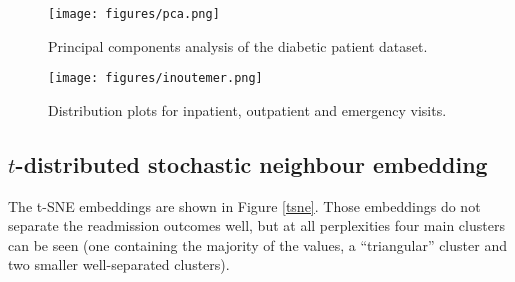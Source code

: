 \documentclass[10pt, twocolumn]{article}
\begin{document}
\begin{figure}[htb!]
	\centering
	\texttt{[image: figures/pca.png]}
	\caption{Principal components analysis of the diabetic patient dataset.}\label{pca}
\end{figure}

\begin{figure}[htb!]
	\centering
	\texttt{[image: figures/inoutemer.png]}
	\caption{Distribution plots for inpatient, outpatient and emergency visits.}\label{inoutemer}
\end{figure}

\subsection{$t$-distributed stochastic neighbour embedding}
The t-SNE embeddings are shown in Figure \ref{tsne}. Those embeddings do not separate the readmission outcomes well, but at all perplexities four main clusters can be seen (one containing the majority of the values, a ``triangular'' cluster and two smaller well-separated clusters).


\medskip
 


\end{document}
